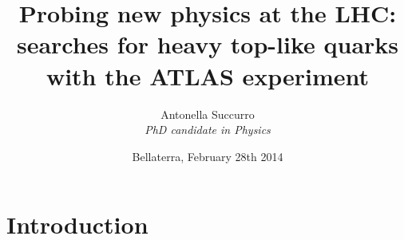 \documentclass[xcolor=dvipsnames,10pt]{beamer}
\title[]{{\bfseries Probing new physics at the LHC: \\ searches for heavy top-like quarks \\ with the ATLAS experiment}}
\author[A Succurro]{Antonella Succurro\\ \vspace{\baselineskip}\textit{\small PhD candidate in Physics}}
\institute[\, \emph{IFAE, UAB}]{}
\date{Bellaterra, February 28th 2014}
\begin{document}
\frame{

\vspace{-.8cm}


\maketitle\centering

\vspace{-.8cm}

}


\section{Introduction}
\end{document}
